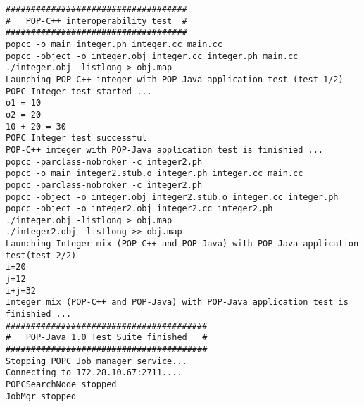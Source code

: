 \begin{lstlisting}[basicstyle=\ttfamily\scriptsize]
####################################
#   POP-C++ interoperability test  #
####################################
popcc -o main integer.ph integer.cc main.cc
popcc -object -o integer.obj integer.cc integer.ph main.cc
./integer.obj -listlong > obj.map
Launching POP-C++ integer with POP-Java application test (test 1/2)
POPC Integer test started ...
o1 = 10
o2 = 20
10 + 20 = 30
POPC Integer test successful
POP-C++ integer with POP-Java application test is finishied ...
popcc -parclass-nobroker -c integer2.ph
popcc -o main integer2.stub.o integer.ph integer.cc main.cc
popcc -parclass-nobroker -c integer2.ph
popcc -object -o integer.obj integer2.stub.o integer.cc integer.ph
popcc -object -o integer2.obj integer2.cc integer2.ph
./integer.obj -listlong > obj.map
./integer2.obj -listlong >> obj.map
Launching Integer mix (POP-C++ and POP-Java) with POP-Java application test(test 2/2)
i=20
j=12
i+j=32
Integer mix (POP-C++ and POP-Java) with POP-Java application test is finishied ...
########################################
#   POP-Java 1.0 Test Suite finished   #
########################################
Stopping POPC Job manager service...
Connecting to 172.28.10.67:2711....
POPCSearchNode stopped
JobMgr stopped
\end{lstlisting}
